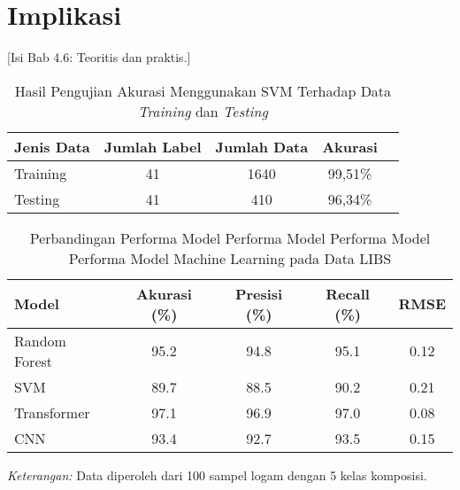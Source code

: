 \section{Implikasi}
[Isi Bab 4.6: Teoritis dan praktis.]


\begin{table}[H]
    \centering
    \caption{Hasil Pengujian Akurasi Menggunakan SVM Terhadap Data \textit{Training} dan \textit{Testing}}
    \label{tb_detail_akurasi_face}
    \begin{tabular}{lcccc}
    \toprule
    \textbf{Jenis Data} & \textbf{Jumlah Label} & \textbf{Jumlah Data} & {\color[HTML]{000000} \textbf{Akurasi}} \\ 
    \midrule
    {\color[HTML]{000000} Training} & {\color[HTML]{000000} 41} & {\color[HTML]{000000} 1640} & {\color[HTML]{000000} 99,51\%} \\ 
    {\color[HTML]{000000} Testing} & {\color[HTML]{000000} 41} & {\color[HTML]{000000} 410} & {\color[HTML]{000000} 96,34\%} \\ 
    \bottomrule
    \end{tabular}
    \end{table}

    \begin{table}[H]
        \centering
        \caption{Perbandingan Performa Model Performa Model Performa Model Performa Model Machine Learning pada Data LIBS}
        \label{tab:performa_ml}
        \centering
        \begin{tabular}{lcccc}
          \toprule
          Model & Akurasi (\%) & Presisi (\%) & Recall (\%) & RMSE \\
          \midrule
          Random Forest & 95.2 & 94.8 & 95.1 & 0.12 \\
          SVM & 89.7 & 88.5 & 90.2 & 0.21 \\
          Transformer & 97.1 & 96.9 & 97.0 & 0.08 \\
          CNN & 93.4 & 92.7 & 93.5 & 0.15 \\
          \bottomrule
        \end{tabular}
        
        \smallskip
        \footnotesize
        \textit{Keterangan:} Data diperoleh dari 100 sampel logam dengan 5 kelas komposisi.
      \end{table}
    

\begin{comment}

\end{comment}